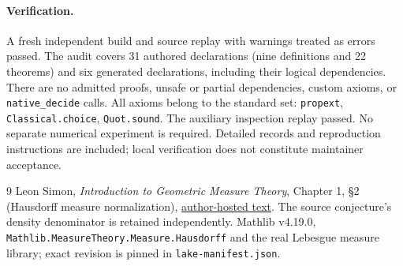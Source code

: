 \documentclass[11pt]{article}
\begin{document}
\paragraph{Verification.}
A fresh independent build and source replay with warnings treated as errors
passed. The audit covers 31 authored declarations (nine definitions and
22 theorems) and six generated declarations, including their logical
dependencies. There are no admitted proofs, unsafe or partial dependencies,
custom axioms, or \texttt{native\_decide} calls. All axioms belong to the
standard set: \texttt{propext}, \texttt{Classical.choice}, \texttt{Quot.sound}.
The auxiliary inspection replay passed. No separate numerical experiment
is required. Detailed records and reproduction instructions are included;
local verification does not constitute maintainer acceptance.

\begin{thebibliography}{9}
 Leon Simon, \emph{Introduction to Geometric Measure Theory},
Chapter 1, \S2 (Hausdorff measure normalization),
\href{https://math.stanford.edu/~lms/ntu-gmt-text.pdf}{author-hosted text}.
The source conjecture's density denominator is retained independently.
 Mathlib v4.19.0,
\texttt{Mathlib.MeasureTheory.Measure.Hausdorff} and the real Lebesgue
measure library; exact revision is pinned in \texttt{lake-manifest.json}.
\end{thebibliography}
\end{document}
